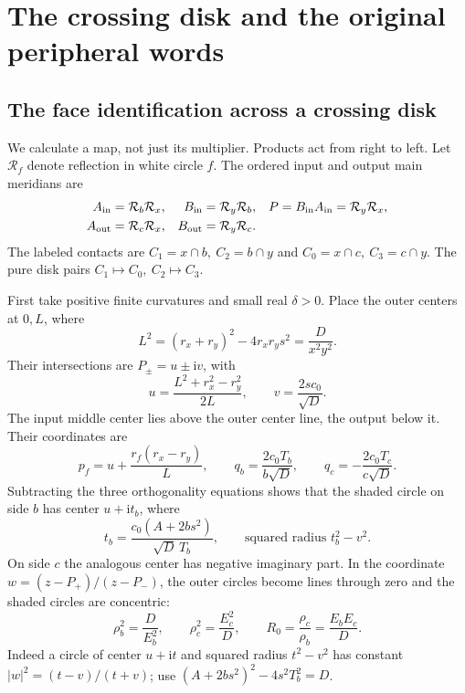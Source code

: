 \documentclass[11pt]{article}
\numberwithin{equation}{section}
\theoremstyle{definition}
\theoremstyle{remark}
\newcommand{\ii}{\mathrm i}
\begin{document}
\section{The crossing disk and the original peripheral words}
\label{mf:words}

\subsection{The face identification across a crossing disk}

We calculate a map, not just its multiplier. Products act from right
to left. Let \(\mathcal R_f\) denote reflection in white circle \(f\).
The ordered input and output main meridians are
\begin{equation}\label{mf:ordered-pairs}
\begin{aligned}
 A_{\rm in}&=\mathcal R_b\mathcal R_x,&
 B_{\rm in}&=\mathcal R_y\mathcal R_b,&
 P&=B_{\rm in}A_{\rm in}=\mathcal R_y\mathcal R_x,\\
 A_{\rm out}&=\mathcal R_c\mathcal R_x,&
 B_{\rm out}&=\mathcal R_y\mathcal R_c.
\end{aligned}
\end{equation}
The labeled contacts are \(C_1=x\cap b,\ C_2=b\cap y\) and
\(C_0=x\cap c,\ C_3=c\cap y\). The pure disk pairs
\(C_1\mapsto C_0,\ C_2\mapsto C_3\).

First take positive finite curvatures and small real \(\delta>0\).
Place the outer centers at \(0,L\), where
\[
 L^2=(r_x+r_y)^2-4r_xr_y s^2=\frac{D}{x^2y^2}.
\]
Their intersections are \(P_\pm=u\pm\ii v\), with
\[
 u=\frac{L^2+r_x^2-r_y^2}{2L},\qquad
 v=\frac{2sc_0}{\sqrt D}.
\]
The input middle center lies above the outer center line, the output
below it. Their coordinates are
\[
 p_f=u+\frac{r_f(r_x-r_y)}L,\qquad
 q_b=\frac{2c_0T_b}{b\sqrt D},\qquad
 q_c=-\frac{2c_0T_c}{c\sqrt D}.
\]
Subtracting the three orthogonality equations shows that the shaded
circle on side \(b\) has center \(u+\ii t_b\), where
\[
 t_b=\frac{c_0(A+2bs^2)}{\sqrt D\,T_b},
 \qquad \text{squared radius }t_b^2-v^2.
\]
On side \(c\) the analogous center has negative imaginary part.
In the coordinate \(w=(z-P_+)/(z-P_-)\), the outer circles become
lines through zero and the shaded circles are concentric:
\begin{equation}\label{mf:shaded-radii}
 \rho_b^2=\frac{D}{E_b^2},\qquad
 \rho_c^2=\frac{E_c^2}{D},\qquad
                       R_0=\frac{\rho_c}{\rho_b}
                            =\frac{E_bE_c}{D}.
\end{equation}
Indeed a circle of center \(u+\ii t\) and squared radius \(t^2-v^2\)
has constant \(|w|^2=(t-v)/(t+v)\); use
\((A+2bs^2)^2-4s^2T_b^2=D\).
\end{document}
